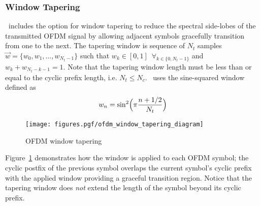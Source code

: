 \subsubsection{Window Tapering}
\label{module:framing:ofdmflexframe:tapering}
\liquid\ includes the option for window tapering to reduce the spectral
side-lobes of the transmitted OFDM signal by allowing adjacent symbols
gracefully transition from one to the next.
The tapering window is sequence of $N_t$ samples
$\vec{w} = \{ w_0, w_1, \ldots, w_{N_t-1} \}$
such that $w_k \in [0,1]\,\,\, \forall_{k \in \{0,N_t-1\}}$ and
$w_k + w_{N_t-k-1} = 1$.
Note that the tapering window length must be less than or equal to the
cyclic prefix length, i.e. $N_t \leq N_c$.
\liquid\ uses the sine-squared window defined as
\cite[(4)]{802.11:standard}
%
\begin{equation}
\label{eqn:ofdmframegen:window}
    w_n = \sin^2\Bigl( \pi\frac{n + 1/2}{N_t} \Bigr)
\end{equation}
%
\begin{figure}
\centering
  \texttt{[image: figures.pgf/ofdm\_window\_tapering\_diagram]}
  \caption{OFDM window tapering}
\label{fig:module:framing:ofdmflexframe_tapering}
\end{figure}
%
Figure~\ref{fig:module:framing:ofdmflexframe_tapering} demonstrates how
the window is applied to each OFDM symbol;
the cyclic postfix of the previous symbol overlaps the current symbol's
cyclic prefix with the applied window providing a graceful transition
region.
Notice that the tapering window does {\em not} extend the length of the
symbol beyond its cyclic prefix.


